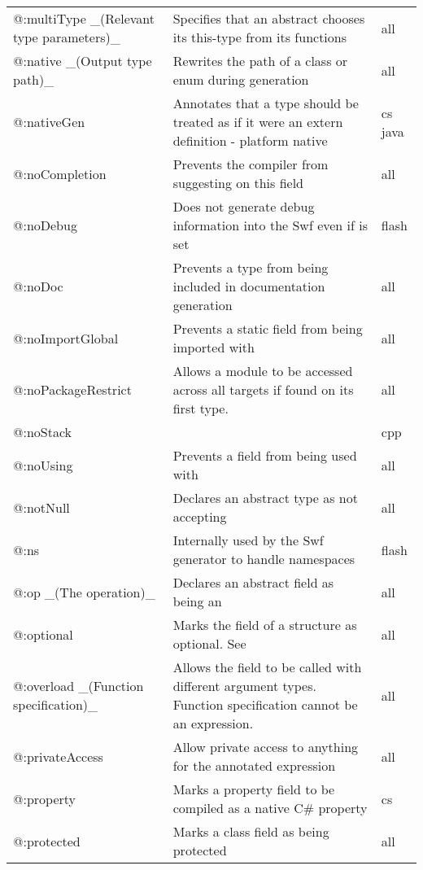 \begin{center}
\begin{tabular}{| l | l | l |}
	@:multiType \_(Relevant type parameters)\_  &  Specifies that an abstract chooses its this-type from its \expr{@:to} functions  &  all \\
	@:native \_(Output type path)\_  &  Rewrites the path of a class or enum during generation  &  all \\
	@:nativeGen  &  Annotates that a type should be treated as if it were an extern definition - platform native  &  cs  java \\
	@:noCompletion  &  Prevents the compiler from suggesting \tref{completion}{cr-completion} on this field  &  all \\
	@:noDebug &  Does not generate debug information into the Swf even if \expr{-debug} is set   &  flash \\
	@:noDoc  &  Prevents a type from being included in documentation generation  &  all \\
	@:noImportGlobal  &  Prevents a static field from being imported with \expr{import Class.*}  &  all \\
	@:noPackageRestrict  &  Allows a module to be accessed across all targets if found on its first type.  &  all \\
	@:noStack &     &  cpp \\
	@:noUsing &  Prevents a field from being used with \expr{using}  &  all \\
	@:notNull &  Declares an abstract type as not accepting \tref{\expr{null} values}{types-nullability}  &  all \\
	@:ns  &  Internally used by the Swf generator to handle namespaces   &  flash \\
	@:op \_(The operation)\_  &   Declares an abstract field as being an \tref{operator overload}{types-abstract-operator-overloading}  &  all \\
	@:optional  &  Marks the field of a structure as optional. See \tref{Optional Arguments}{types-nullability-optional-arguments}  &  all \\
	@:overload \_(Function specification)\_  &  Allows the field to be called with different argument types. Function specification cannot be an expression.  &  all \\
	@:privateAccess  &  Allow private access to anything for the annotated expression  &  all \\
	@:property  &  Marks a property field to be compiled as a native C\# property   &  cs \\
	@:protected  &  Marks a class field as being protected  &  all \\

\end{tabular}
\end{center}

